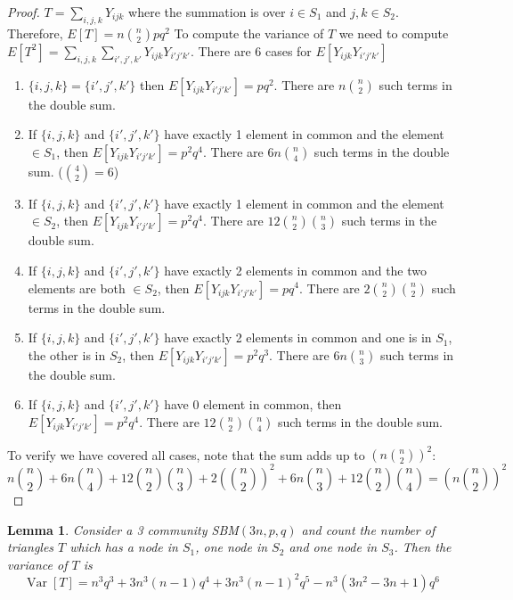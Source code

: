 \documentclass{article}
\newtheorem{lemma}{Lemma}
\DeclareMathOperator{\Var}{Var}
\begin{document}
\begin{proof}
	$T=\sum_{i,j,k} Y_{ijk}$ where the summation is over $i \in S_1$ and $j,k \in S_2$. Therefore, $E[T] = n\binom{n}{2}pq^2$
	To compute the variance of $T$ we need to compute $E[T^2] = \sum_{i,j,k}\sum_{i',j',k'} Y_{ijk}Y_{i'j'k'}$.
	There are 6 cases for $E[Y_{ijk}Y_{i'j'k'}]$
	\begin{enumerate}
		\item $\{i,j,k\} = \{i',j',k'\}$ then $E[Y_{ijk}Y_{i'j'k'}] = pq^2$.
		There are $n\binom{n}{2}$ such terms in the double sum.
		\item If $\{i,j,k\}$ and $\{i',j',k'\}$ have exactly 1 element in common and the element $\in S_1$, then $E[Y_{ijk}Y_{i'j'k'}] = p^2q^4$.
		There are $6n\binom{n}{4}$ such terms in the double sum. ($\binom{4}{2}=6$)
		\item If $\{i,j,k\}$ and $\{i',j',k'\}$ have exactly 1 element in common and the element $\in S_2$, then $E[Y_{ijk}Y_{i'j'k'}] = p^2q^4$.
		There are $12\binom{n}{2}\binom{n}{3}$ such terms in the double sum.
		\item If $\{i,j,k\}$ and $\{i',j',k'\}$ have exactly 2 elements in common and the two elements are both $\in S_2$, then $E[Y_{ijk}Y_{i'j'k'}] = pq^4$.
There are $2\binom{n}{2}\binom{n}{2}$ such terms in the double sum.
\item If $\{i,j,k\}$ and $\{i',j',k'\}$ have exactly 2 elements in common and one is in $S_1$, the other is in $S_2$, then $E[Y_{ijk}Y_{i'j'k'}] = p^2q^3$.
There are $6n\binom{n}{3}$ such terms in the double sum.
\item If $\{i,j,k\}$ and $\{i',j',k'\}$ have 0 element in common, then $E[Y_{ijk}Y_{i'j'k'}] = p^2q^4$.
There are $12\binom{n}{2}\binom{n}{4}$ such terms in the double sum.
	\end{enumerate}
To verify we have covered all cases, note that the sum adds up to $(n\binom{n}{2})^2$:
$$
n\binom{n}{2} + 6n\binom{n}{4} + 12\binom{n}{2} \binom{n}{3} + 2(\binom{n}{2})^2 + 6n\binom{n}{3} + 12\binom{n}{2}\binom{n}{4} = \left(n\binom{n}{2}\right)^2
$$
\end{proof}
\begin{lemma}\label{lem:SBM_tr_counting_3}
	Consider a 3 community SBM$(3n, p, q)$ and count the number of triangles $T$ which has a node in $S_1$, one node in $S_2$ and one node in $S_3$.
	Then the variance of $T$ is
	\begin{equation}\label{eq:SBM_tr_counting_three}
	\Var[T] = n^3 q^3  + 3n^3(n-1) q^4  + 3 n^3 (n-1)^2 q^5 - n^3(3n^2-3n+1)q^6
	\end{equation}
\end{lemma}
\end{document}
